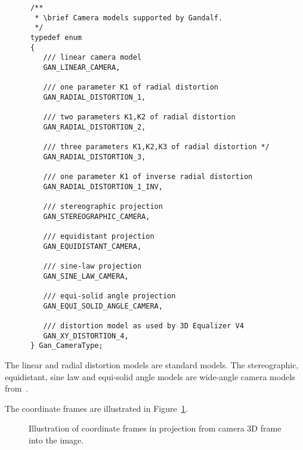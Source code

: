 \begin{verbatim}
      /**
       * \brief Camera models supported by Gandalf.
       */
      typedef enum
      {
         /// linear camera model
         GAN_LINEAR_CAMERA,

         /// one parameter K1 of radial distortion
         GAN_RADIAL_DISTORTION_1,

         /// two parameters K1,K2 of radial distortion
         GAN_RADIAL_DISTORTION_2,

         /// three parameters K1,K2,K3 of radial distortion */
         GAN_RADIAL_DISTORTION_3,

         /// one parameter K1 of inverse radial distortion
         GAN_RADIAL_DISTORTION_1_INV,

         /// stereographic projection
         GAN_STEREOGRAPHIC_CAMERA,

         /// equidistant projection
         GAN_EQUIDISTANT_CAMERA,

         /// sine-law projection
         GAN_SINE_LAW_CAMERA,

         /// equi-solid angle projection
         GAN_EQUI_SOLID_ANGLE_CAMERA,

         /// distortion model as used by 3D Equalizer V4
         GAN_XY_DISTORTION_4,
      } Gan_CameraType;
\end{verbatim}
The linear and radial distortion models are standard models.
The stereographic, equidistant, sine law and equi-solid angle models are
wide-angle camera models from~\cite{Fleck:TR94}.

The coordinate frames are illustrated in Figure~\ref{camera}.
\begin{figure}
 \centerline{}
 \caption{Illustration of coordinate frames in projection from camera 3D
          frame into the image.}
 \label{camera}
\end{figure}

